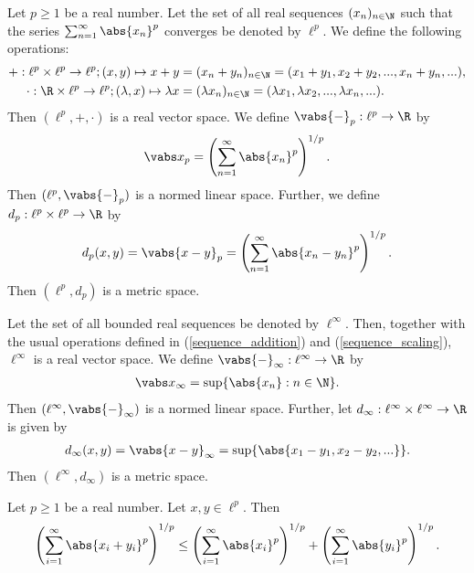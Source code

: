 \documentclass{article}
\begin{document}
\begin{lemma}
	Let $p\geq 1$ be a real number.
	Let the set of all real sequences $(x_n)_{n\in\N}$ such that the series
	$\sum_{n=1}^\infty \abs{x_n}^p$ converges be denoted by $\ell^p$.
	We define the following operations:
	\begin{align}
		\label{sequence_addition}
		+:\ell^p\times \ell^p\to \ell^p;(x,y)\mapsto x+y            & =(x_n+y_n)_{n\in\N}=(x_1+y_1,x_2+y_2,...,x_n+y_n,...),                 \\
		\label{sequence_scaling}
		\cdot:\R\times \ell^p\to \ell^p;(\lambda,x)\mapsto\lambda x & =(\lambda x_n)_{n\in\N}=(\lambda x_1,\lambda x_2,...,\lambda x_n,...).
	\end{align}
	Then $(\ell^p,+,\cdot)$ is a real vector space.
	We define $\vabs{-}_p:\ell^p\to\R$ by
	\begin{align*}
		\vabs x_p = \left(\sum_{n=1}^\infty \abs{x_n}^p\right)^{1/p}.
	\end{align*}
	Then $(\ell^p, \vabs{-}_p)$ is a normed linear space.
	Further, we define $d_p:\ell^p\times \ell^p\to\R$ by
	\begin{align*}
		d_p(x,y)=\vabs{x-y}_p=\left(\sum_{n=1}^\infty\abs{x_n-y_n}^p\right)^{1/p}.
	\end{align*}
	Then $(\ell^p,d_p)$ is a metric space.
\end{lemma}

\begin{lemma}
	Let the set of all bounded real sequences be denoted by $\ell^\infty$. Then, together with
	the usual operations defined in (\ref{sequence_addition}) and (\ref{sequence_scaling}),
	$\ell^\infty$ is a real vector space.
	We define $\vabs{-}_\infty:\ell^\infty\to\R$ by
	\begin{align*}
		\vabs x_\infty = \sup\{\abs{x_n}:n\in\N\}.
	\end{align*}
	Then $(\ell^\infty,\vabs{-}_\infty)$ is a normed linear space.
	Further, let $d_\infty:\ell^\infty\times \ell^\infty\to\R$ is given by
	\begin{align*}
		d_\infty(x,y)=\vabs{x-y}_\infty = \sup\{\abs{x_1-y_1,x_2-y_2,...}\}.
	\end{align*}
	Then $(\ell^\infty, d_\infty)$ is a metric space.
\end{lemma}

\begin{lemma}
	Let $p\geq 1$ be a real number. Let $x,y\in \ell^p$. Then
	\begin{align*}
		\left(\sum_{i=1}^\infty \abs{x_i+y_i}^p\right)^{1/p}
		\leq \left(\sum_{i=1}^\infty \abs{x_i}^p\right)^{1/p}
		+ \left(\sum_{i=1}^\infty \abs{y_i}^p\right)^{1/p}.
	\end{align*}
\end{lemma}
\end{document}
